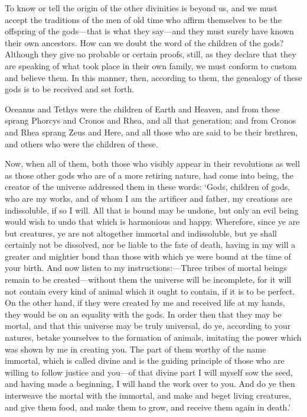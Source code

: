 To know or tell the origin of the other divinities is beyond us, and we
must accept the traditions of the men of old time who affirm themselves to
be the offspring of the gods—that is what they say—and they
must surely have known their own ancestors. How can we doubt the word of
the children of the gods? Although they give no probable or certain
proofs, still, as they declare that they are speaking of what took place
in their own family, we must conform to custom and believe them. In this
manner, then, according to them, the genealogy of these gods is to be
received and set forth.

Oceanus and Tethys were the children of Earth and Heaven, and from these
sprang Phorcys and Cronos and Rhea, and all that generation; and from
Cronos and Rhea sprang Zeus and Here, and all those who are said to be
their brethren, and others who were the children of these.

Now, when all of them, both those who visibly appear in their revolutions
as well as those other gods who are of a more retiring nature, had come
into being, the creator of the universe addressed them in these words:
‘Gods, children of gods, who are my works, and of whom I am the artificer
and father, my creations are indissoluble, if so I will. All that is bound
may be undone, but only an evil being would wish to undo that which is
harmonious and happy. Wherefore, since ye are but creatures, ye are not
altogether immortal and indissoluble, but ye shall certainly not be
dissolved, nor be liable to the fate of death, having in my will a greater
and mightier bond than those with which ye were bound at the time of your
birth. And now listen to my instructions:—Three tribes of mortal
beings remain to be created—without them the universe will be
incomplete, for it will not contain every kind of animal which it ought to
contain, if it is to be perfect. On the other hand, if they were created
by me and received life at my hands, they would be on an equality with the
gods. In order then that they may be mortal, and that this universe may be
truly universal, do ye, according to your natures, betake yourselves to
the formation of animals, imitating the power which was shown by me in
creating you. The part of them worthy of the name immortal, which is
called divine and is the guiding principle of those who are willing to
follow justice and you—of that divine part I will myself sow the
seed, and having made a beginning, I will hand the work over to you. And
do ye then interweave the mortal with the immortal, and make and beget
living creatures, and give them food, and make them to grow, and receive
them again in death.’

